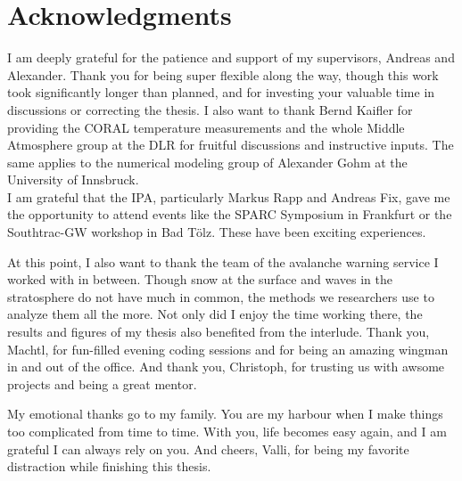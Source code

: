 \chapter*{Acknowledgments}
\thispagestyle{plain}

I am deeply grateful for the patience and support of my supervisors, Andreas and Alexander. Thank you for being super flexible along the way, though this work took significantly longer than planned, and for investing your valuable time in discussions or correcting the thesis. I also want to thank Bernd Kaifler for providing the CORAL temperature measurements and the whole Middle Atmosphere group at the DLR for fruitful discussions and instructive inputs. The same applies to the numerical modeling group of Alexander Gohm at the University of Innsbruck.\\
I am grateful that the IPA, particularly Markus Rapp and Andreas Fix, gave me the opportunity to attend events like the SPARC Symposium in Frankfurt or the Southtrac-GW workshop in Bad Tölz. These have been exciting experiences.

At this point, I also want to thank the team of the avalanche warning service I worked with in between. Though snow at the surface and waves in the stratosphere do not have much in common, the methods we researchers use to analyze them all the more. Not only did I enjoy the time working there, the results and figures of my thesis also benefited from the interlude. Thank you, Machtl, for fun-filled evening coding sessions and for being an amazing wingman in and out of the office. And thank you, Christoph, for trusting us with awsome projects and being a great mentor.

My emotional thanks go to my family. You are my harbour when I make things too complicated from time to time. With you, life becomes easy again, and I am grateful I can always rely on you. And cheers, Valli, for being my favorite distraction while finishing this thesis.




